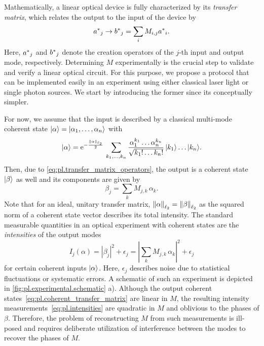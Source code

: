 Mathematically, a linear optical device is fully characterized by its \emph{transfer matrix}, which relates the output to the input of the device by
\[
  \label{eq:pl.transfer_matrix_operators}
  {{a}^\ast}_j \rightarrow {{b}^\ast}_j = \sum_i M_{i,j} {{a}^\ast}_i.
\]
Here, ${{a}^\ast}_j$ and ${{b}^\ast}_j$ denote the creation operators of the $j$-th input and output mode, respectively.
Determining ${M}$ experimentally is the crucial step to validate and verify a linear optical circuit.
For this purpose, we propose a protocol that can be implemented easily in an experiment using either classical laser light or single photon sources.
We start by introducing the former since its conceptually simpler.

For now, we assume that the input is described by a classical multi-mode coherent state $\ket{{\alpha}} = \ket{\alpha_1, \ldots, \alpha_n}$ with
\[
  \ket{\alpha} = \mathrm{e}^{-\frac{\ltwonorm{\alpha}}{2}} \, \sum_{k_1,\ldots,k_n}  \frac{\alpha_1^{k_1} \ldots \alpha_n^{k_n}}{\sqrt{k_1! \ldots k_n!}} \, \ket{k_1} \ldots \ket{k_n}.
\]
Then, due to \cref{eq:pl.transfer_matrix_operators}, the output is a coherent state $\ket{\beta}$ as well and its components are given by
\[
  \beta_j = \sum_k M_{j,k} \,\alpha_k.
  \label{eq:pl.coherent_transfer_matrix}
\]
Note that for an ideal, unitary transfer matrix, ${\Vert\alpha\Vert}_{\ell_2} = {\Vert\beta\Vert}_{\ell_2}$ as the squared norm of a coherent state vector describes its total intensity.
The standard measurable quantities in an optical experiment with coherent states are the \emph{intensities} of the output modes
\[
  I_j({\alpha})
  = \left| \beta_j \right|^2 + \epsilon_j
  = \left| \sum_k M_{j,k} \, \alpha_k \right|^2 + \epsilon_j
  \label{eq:pl.intensities}
\]
for certain coherent inputs $\ket{{\alpha}}$.
Here, $\epsilon_j$ describes noise due to statistical fluctuations or systematic errors.
A schematic of such an experiment is depicted in \cref{fig:pl.experimental.schematic} a).
Although the output coherent states~\eqref{eq:pl.coherent_transfer_matrix} are linear in ${M}$, the resulting intensity measurements~\eqref{eq:pl.intensities} are quadratic in ${M}$ and oblivious to the phases of $\beta$.
Therefore, the problem of reconstructing ${M}$ from such measurements is ill-posed and requires deliberate utilization of interference between the modes to recover the phases of $M$.

